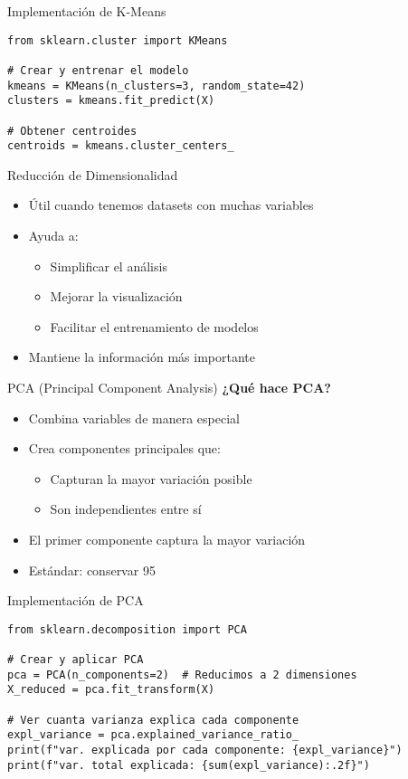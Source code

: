 \documentclass{beamer}
\begin{document}
\begin{frame}[fragile]{Implementación de K-Means}
    \begin{lstlisting}
from sklearn.cluster import KMeans

# Crear y entrenar el modelo
kmeans = KMeans(n_clusters=3, random_state=42)
clusters = kmeans.fit_predict(X)

# Obtener centroides
centroids = kmeans.cluster_centers_
    \end{lstlisting}
\end{frame}

\begin{frame}{Reducción de Dimensionalidad}
    \begin{itemize}
        \item<1-> Útil cuando tenemos datasets con muchas variables
        \item<2-> Ayuda a:
        \begin{itemize}
            \item Simplificar el análisis
            \item Mejorar la visualización
            \item Facilitar el entrenamiento de modelos
        \end{itemize}
        \item<3-> Mantiene la información más importante
    \end{itemize}
\end{frame}

\begin{frame}{PCA (Principal Component Analysis)}
    \textbf{¿Qué hace PCA?}
    \begin{itemize}
        \item<1-> Combina variables de manera especial
        \item<2-> Crea componentes principales que:
        \begin{itemize}
            \item Capturan la mayor variación posible
            \item Son independientes entre sí
        \end{itemize}
        \item<3-> El primer componente captura la mayor variación
        \item<4-> Estándar: conservar 95%
    \end{itemize}
\end{frame}

\begin{frame}[fragile]{Implementación de PCA}
    \begin{lstlisting}
from sklearn.decomposition import PCA

# Crear y aplicar PCA
pca = PCA(n_components=2)  # Reducimos a 2 dimensiones
X_reduced = pca.fit_transform(X)

# Ver cuanta varianza explica cada componente
expl_variance = pca.explained_variance_ratio_
print(f"var. explicada por cada componente: {expl_variance}")
print(f"var. total explicada: {sum(expl_variance):.2f}")
    \end{lstlisting}
\end{frame}
\end{document}

